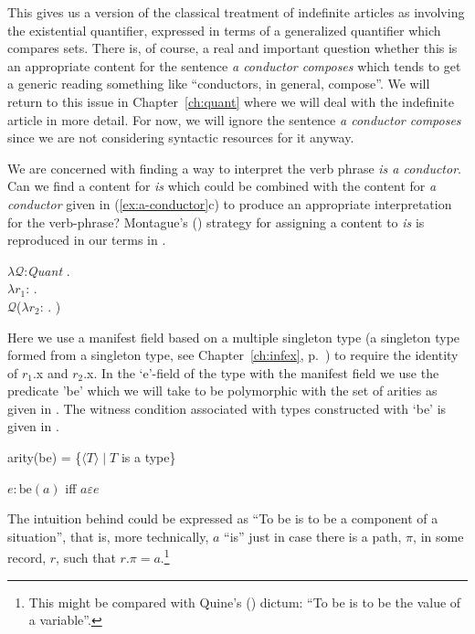 This gives us a version of the classical treatment of indefinite
articles as involving the existential quantifier, expressed in terms
of a generalized quantifier which compares sets.  There is, of course,
a real and important question whether this is an appropriate content
for the sentence \textit{a conductor composes} which tends to get a
generic reading something like ``conductors, in general, compose''.
We will return to this issue in Chapter~\ref{ch:quant} where we will
deal with the indefinite article in more detail.  For now, we will
ignore the sentence \textit{a conductor composes} since we are not
considering syntactic resources for it anyway.  

We are concerned
with finding a way to interpret the verb phrase \textit{is a
  conductor}.  Can we find a content for \textit{is} which could be
combined with the content for \textit{a conductor} given in
(\ref{ex:a-conductor}c) to produce an appropriate interpretation for
the verb-phrase?  Montague's (\citeyear{Montague1973}) strategy for
assigning a content to \textit{is} is reproduced in our terms in
\nexteg{}.
\begin{ex} 
$\lambda\mathcal{Q}$:\textit{Quant} . \\
\hspace*{1em} $\lambda r_1$:
. \\
\hspace*{2em} $\mathcal{Q}$($\lambda
r_2$:
. )
\label{ex:cont-is} 
\end{ex}



Here we use a manifest field based on a multiple singleton type (a
singleton type formed from a singleton type, see
Chapter~\ref{ch:infex}, p.~\pageref{pg:multiple-singleton-types}) to require
the identity of $r_1$.x and $r_2$.x.  In the `e'-field of the type
with the manifest field we use the predicate 'be' which we will take
to be polymorphic with the set of arities  as given in .  The witness
condition associated with types constructed with `be' is given in
.
\begin{ex} 
\begin{subex} 
 
\item arity(be) = \{$\langle T\rangle\mid T$ is a type\} 
 
\item $e:\text{be}(a)$ iff $a\varepsilon e$ 
 
\end{subex} 
   
\end{ex} 
The intuition behind  could be expressed as ``To be is to be
a component of a situation'', that is, more technically, $a$ ``is''
just in case there is a path, $\pi$, 
in some record, $r$, such that $r.\pi=a$.\footnote{This might be
  compared with Quine's (\citeyear{Quine1948}) dictum:  ``To be is to
  be the value of a variable''.}   
  
